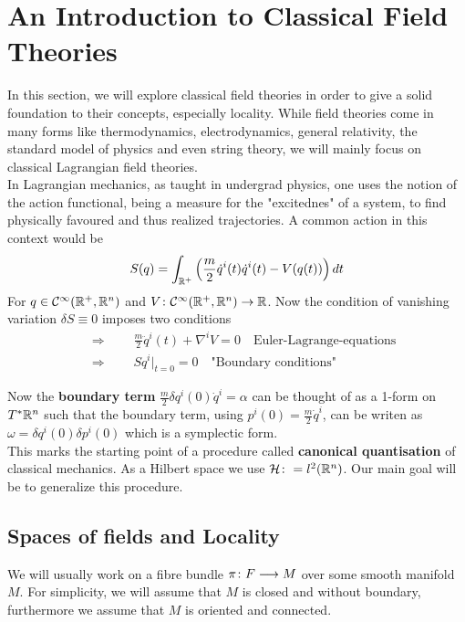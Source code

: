 \section{An Introduction to Classical Field Theories}
\label{sec:Classical_FT}
In this section, we will explore classical field theories  in order to give a solid foundation to their concepts, especially locality. While field theories come in many forms like thermodynamics, electrodynamics, general relativity, the standard model of physics and even string theory, we will mainly focus on classical Lagrangian field theories.\\

In Lagrangian mechanics, as taught in undergrad physics, one uses the notion of the action functional, being a measure for the "excitednes" of a system, to find physically favoured and thus realized trajectories. A common action in this context would be
$$ S(q) = \int_{\mathbb{R}^+} \left( \frac{m}{2} \dot q^i(t) \dot q^i(t) - V(q(t)) \right) dt $$
For $q\in \mathcal{C}^{\infty}(\mathbb{R}^+, \mathbb{R}^n)$ and $V\colon\mathcal{C}^{\infty}(\mathbb{R}^+, \mathbb{R}^n) \rightarrow \mathbb{R}$. Now the condition of vanishing variation $\delta S \equiv 0$ imposes two conditions
\begin{align*}
  &\Rightarrow \quad \quad \frac{m}{2} \ddot q^i(t) + \nabla^i V = 0 \quad \text{Euler-Lagrange-equations}\\
  &\Rightarrow \quad \quad S q^i \Big|_{t=0} = 0 \quad \text{"Boundary conditions"}
\end{align*}

Now the \textbf{boundary term} $\frac{m}{2}\delta q^i(0) \dot q^i = \alpha$ can be thought of as a 1-form on $T^*\mathbb{R}^n$ such that the boundary term, using $p^i(0) = \frac{m}{2} \dot q^i$, can be writen as $\omega = \delta q^i(0) \delta p^i(0)$ which is a symplectic form.\\

This marks the starting point of a procedure called \textbf{canonical quantisation} of classical mechanics. As a Hilbert space we use $\mathcal{H} \colon= l^2(\mathbb{R}^n)$. Our main goal will be to generalize this procedure.\\

\subsection{Spaces of fields and Locality}
We will usually work on a fibre bundle $\pi\colon F \longrightarrow M$ over some smooth manifold $M$. For simplicity, we will assume that $M$ is closed and without boundary, furthermore we assume that $M$ is oriented and connected.


